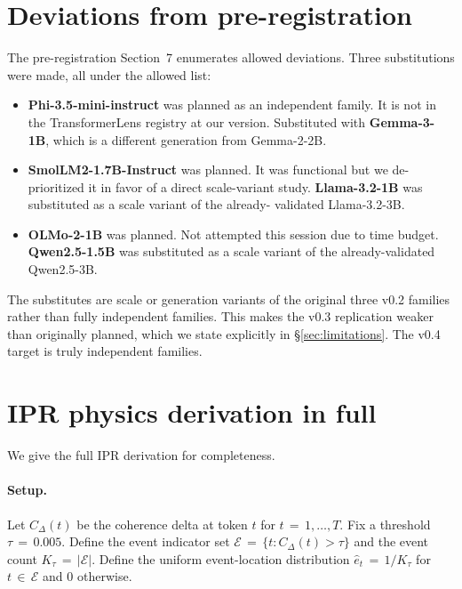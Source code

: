\documentclass[11pt,letterpaper]{article}
\begin{document}
\section{Deviations from pre-registration}
\label{app:deviations}

The pre-registration Section~7 enumerates allowed deviations.
Three substitutions were made, all under the allowed list:

\begin{itemize}[leftmargin=18pt,itemsep=2pt,topsep=3pt]
\item \textbf{Phi-3.5-mini-instruct} was planned as an independent family.
It is not in the TransformerLens registry at our version. Substituted with
\textbf{Gemma-3-1B}, which is a different generation from Gemma-2-2B.
\item \textbf{SmolLM2-1.7B-Instruct} was planned. It was functional but we
de-prioritized it in favor of a direct scale-variant study.
\textbf{Llama-3.2-1B} was substituted as a scale variant of the already-
validated Llama-3.2-3B.
\item \textbf{OLMo-2-1B} was planned. Not attempted this session due to
time budget. \textbf{Qwen2.5-1.5B} was substituted as a scale variant of
the already-validated Qwen2.5-3B.
\end{itemize}

The substitutes are scale or generation variants of the original three
v0.2 families rather than fully independent families. This makes the
v0.3 replication weaker than originally planned, which we state
explicitly in \S\ref{sec:limitations}. The v0.4 target is truly
independent families.

\section{IPR physics derivation in full}
\label{app:ipr}

We give the full IPR derivation for completeness.

\paragraph{Setup.} Let $C_\Delta(t)$ be the coherence delta at token $t$
for $t\,=\,1,\dots,T$. Fix a threshold $\tau\,=\,0.005$. Define the
event indicator set $\mathcal{E}\,=\,\{t : C_\Delta(t)>\tau\}$ and the
event count $K_\tau\,=\,|\mathcal{E}|$. Define the uniform event-location
distribution $\hat{e}_t\,=\,1/K_\tau$ for $t\,\in\,\mathcal{E}$ and $0$
otherwise.
\end{document}
